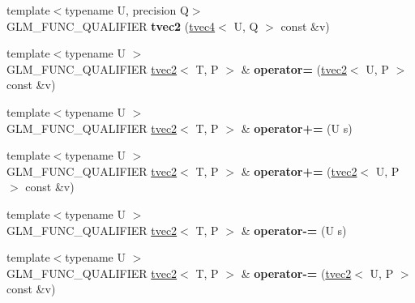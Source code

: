 \begin{DoxyCompactItemize}
\item 
\hypertarget{structglm_1_1detail_1_1tvec2_aca6e6031778d2739ec29acfdfc744dc1}{{\footnotesize template$<$typename U, precision Q$>$ }\\G\-L\-M\-\_\-\-F\-U\-N\-C\-\_\-\-Q\-U\-A\-L\-I\-F\-I\-E\-R {\bfseries tvec2} (\hyperlink{structglm_1_1detail_1_1tvec4}{tvec4}$<$ U, Q $>$ const \&v)}\label{structglm_1_1detail_1_1tvec2_aca6e6031778d2739ec29acfdfc744dc1}

\item 
\hypertarget{structglm_1_1detail_1_1tvec2_ac89b8aa7379fe8d552c555d6791a8ae1}{{\footnotesize template$<$typename U $>$ }\\G\-L\-M\-\_\-\-F\-U\-N\-C\-\_\-\-Q\-U\-A\-L\-I\-F\-I\-E\-R \hyperlink{structglm_1_1detail_1_1tvec2}{tvec2}$<$ T, P $>$ \& {\bfseries operator=} (\hyperlink{structglm_1_1detail_1_1tvec2}{tvec2}$<$ U, P $>$ const \&v)}\label{structglm_1_1detail_1_1tvec2_ac89b8aa7379fe8d552c555d6791a8ae1}

\item 
\hypertarget{structglm_1_1detail_1_1tvec2_a5e554e1eddaa2b17c7974c117c9123e2}{{\footnotesize template$<$typename U $>$ }\\G\-L\-M\-\_\-\-F\-U\-N\-C\-\_\-\-Q\-U\-A\-L\-I\-F\-I\-E\-R \hyperlink{structglm_1_1detail_1_1tvec2}{tvec2}$<$ T, P $>$ \& {\bfseries operator+=} (U s)}\label{structglm_1_1detail_1_1tvec2_a5e554e1eddaa2b17c7974c117c9123e2}

\item 
\hypertarget{structglm_1_1detail_1_1tvec2_ab3b31e72f4dfa1ad16b84ac277ea83e4}{{\footnotesize template$<$typename U $>$ }\\G\-L\-M\-\_\-\-F\-U\-N\-C\-\_\-\-Q\-U\-A\-L\-I\-F\-I\-E\-R \hyperlink{structglm_1_1detail_1_1tvec2}{tvec2}$<$ T, P $>$ \& {\bfseries operator+=} (\hyperlink{structglm_1_1detail_1_1tvec2}{tvec2}$<$ U, P $>$ const \&v)}\label{structglm_1_1detail_1_1tvec2_ab3b31e72f4dfa1ad16b84ac277ea83e4}

\item 
\hypertarget{structglm_1_1detail_1_1tvec2_aa1c0434d611d89e971c8f99d332fd634}{{\footnotesize template$<$typename U $>$ }\\G\-L\-M\-\_\-\-F\-U\-N\-C\-\_\-\-Q\-U\-A\-L\-I\-F\-I\-E\-R \hyperlink{structglm_1_1detail_1_1tvec2}{tvec2}$<$ T, P $>$ \& {\bfseries operator-\/=} (U s)}\label{structglm_1_1detail_1_1tvec2_aa1c0434d611d89e971c8f99d332fd634}

\item 
\hypertarget{structglm_1_1detail_1_1tvec2_a08f1294adb7685695d5efa49c7cbe5e7}{{\footnotesize template$<$typename U $>$ }\\G\-L\-M\-\_\-\-F\-U\-N\-C\-\_\-\-Q\-U\-A\-L\-I\-F\-I\-E\-R \hyperlink{structglm_1_1detail_1_1tvec2}{tvec2}$<$ T, P $>$ \& {\bfseries operator-\/=} (\hyperlink{structglm_1_1detail_1_1tvec2}{tvec2}$<$ U, P $>$ const \&v)}\label{structglm_1_1detail_1_1tvec2_a08f1294adb7685695d5efa49c7cbe5e7}


\end{DoxyCompactItemize}
